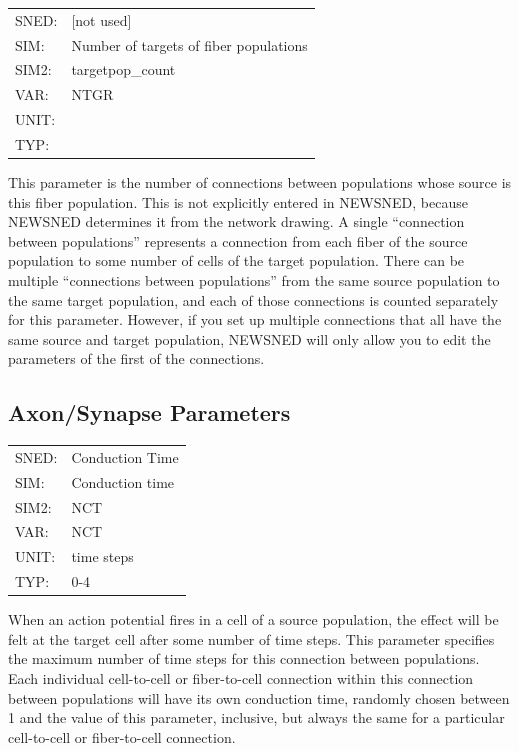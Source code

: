 \documentclass[12pt,openany,oneside]{book}
\begin{document}
\begin{flushleft}
\begin{tabular}{@{}ll@{}}
SNED: & [not used]\\
SIM: & Number of targets of fiber populations\\
SIM2: & targetpop\_count\\
VAR: & NTGR\\
UNIT: &\\
TYP: &\\
\end{tabular}
\end{flushleft}
\noindent
This parameter is the number of connections between populations whose
source is this fiber population.  This is not explicitly entered in
NEWSNED, because NEWSNED determines it from the network drawing.  A
single ``connection between populations'' represents a connection from
each fiber of the source population to some number of cells of the
target population.  There can be multiple ``connections between
populations'' from the same source population to the same target
population, and each of those connections is counted separately for
this parameter.  However, if you set up multiple connections that all
have the same source and target population, NEWSNED will only allow
you to edit the parameters of the first of the connections.
\filbreak
\vspace{\baselineskip}

\subsection{Axon/Synapse Parameters}
\label{Axon Parameters}

\begin{flushleft}
\begin{tabular}{@{}ll@{}}
SNED: & Conduction Time\\
SIM: & Conduction time\\
SIM2: & NCT\\
VAR: & NCT\\
UNIT: & time steps\\
TYP: & 0-4\\
\end{tabular}
\end{flushleft}
\noindent
When an action potential fires in a cell of a source population, the
effect will be felt at the target cell after some number of time
steps.  This parameter specifies the maximum number of time steps for
this connection between populations.  Each individual cell-to-cell or
fiber-to-cell connection within this connection between populations
will have its own conduction time, randomly chosen between 1 and the
value of this parameter, inclusive, but always the same for a
particular cell-to-cell or fiber-to-cell connection.
\filbreak
\vspace{\baselineskip}
\end{document}
